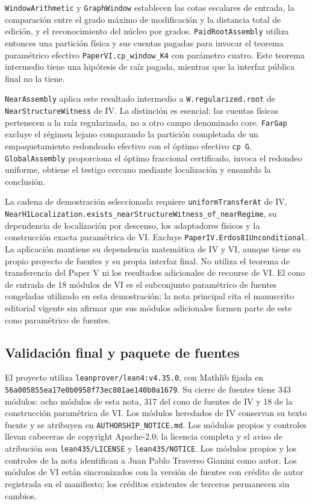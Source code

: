 \documentclass[spanish,11pt,a4paper]{article}
\begin{document}
\nolinkurl{WindowArithmetic} y \nolinkurl{GraphWindow} establecen las cotas
escalares de entrada, la comparación entre el grado máximo de
modificación y la distancia total de edición, y el reconocimiento del
núcleo por grados. \nolinkurl{PaidRootAssembly} utiliza entonces una
partición física y sus cuentas pagadas para invocar el teorema
paramétrico efectivo \nolinkurl{PaperVI.cp_window_K4} con parámetro
cuatro. Este teorema intermedio tiene una hipótesis de raíz pagada,
mientras que la interfaz pública final no la tiene.

\nolinkurl{NearAssembly} aplica este resultado intermedio a
\nolinkurl{W.regularized.root} de \nolinkurl{NearStructureWitness} de IV. La
distinción es esencial: las cuentas físicas pertenecen a la raíz
regularizada, no a otro campo denominado core. \nolinkurl{FarGap} excluye
el régimen lejano comparando la partición completada de un
empaquetamiento redondeado efectivo con el óptimo efectivo
\texttt{cp\ G}. \nolinkurl{GlobalAssembly} proporciona el óptimo fraccional
certificado, invoca el redondeo uniforme, obtiene el testigo cercano
mediante localización y ensambla la conclusión.

La cadena de demostración seleccionada requiere
\nolinkurl{uniformTransferAt} de IV,
\nolinkurl{NearH1Localization.exists_nearStructureWitness_of_nearRegime},
su dependencia de localización por descenso, los adaptadores físicos y
la construcción exacta paramétrica de VI. Excluye
\nolinkurl{PaperIV.Erdos81Unconditional}. La aplicación mantiene su
dependencia matemática de IV y VI, aunque tiene su propio proyecto de
fuentes y su propia interfaz final. No utiliza el teorema de
transferencia del Paper V ni los resultados adicionales de recourse de
VI. El cono de entrada de 18 módulos de VI es el subconjunto paramétrico
de fuentes congeladas utilizado en esta demostración; la nota principal
cita el manuscrito editorial vigente sin afirmar que sus módulos
adicionales formen parte de este cono paramétrico de fuentes.

\subsection{Validación final y paquete de
fuentes}\label{validaciuxf3n-final-y-paquete-de-fuentes}

El proyecto utiliza \nolinkurl{leanprover/lean4:v4.35.0}, con Mathlib
fijada en \nolinkurl{56a005855ea17e0b0958f73ec801ae140b0a1679}. Su cierre
de fuentes tiene 343 módulos: ocho módulos de esta nota, 317 del cono de
fuentes de IV y 18 de la construcción paramétrica de VI. Los módulos
heredados de IV conservan su texto fuente y se atribuyen en
\nolinkurl{AUTHORSHIP_NOTICE.md}. Los módulos propios y controles llevan
cabeceras de copyright Apache-2.0; la licencia completa y el aviso de
atribución son \nolinkurl{lean435/LICENSE} y \nolinkurl{lean435/NOTICE}. Los
módulos propios y los controles de la nota identifican a Juan Pablo
Traverso Gianini como autor. Los módulos de VI están sincronizados con
la versión de fuentes con crédito de autor registrada en el manifiesto;
los créditos existentes de terceros permanecen sin cambios.
\end{document}

